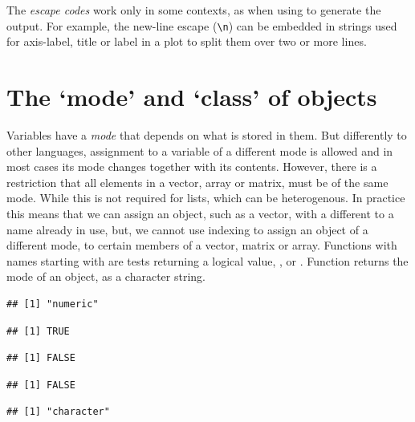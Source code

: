 \documentclass[krantz2]{krantz}\usepackage{knitr}%
\begin{document}
The \textit{escape codes} work only in some contexts, as when using  to generate the output. For example, the new-line escape (\verb|\n|) can be embedded in strings used for axis-label, title or label in a plot to split them over two or more lines.

\section{The `mode' and `class' of objects}\label{sec:rlang:mode}
Variables have a \emph{mode} that depends on what is stored in them. But differently to other languages, assignment to a variable of a different mode is allowed and in most cases its mode changes together with its contents. However, there is a restriction that all elements in a vector, array or matrix, must be of the same mode. While this is not required for lists, which can be heterogenous. In practice this means that we can assign an object, such as a vector, with a different  to a name already in use, but, we cannot use indexing to assign an object of a different mode, to certain members of a vector, matrix or array. Functions with names starting with  are tests returning a logical value, ,  or . Function  returns the mode of an object, as a character string.

\begin{knitrout}\footnotesize
{}\color{fgcolor}\begin{kframe}
\begin{alltt}
 \hlkwb{<-} \hlopt{:}
\end{alltt}
\begin{verbatim}
## [1] "numeric"
\end{verbatim}
\begin{alltt}
\end{alltt}
\begin{verbatim}
## [1] TRUE
\end{verbatim}
\begin{alltt}
\end{alltt}
\begin{verbatim}
## [1] FALSE
\end{verbatim}
\begin{alltt}
\end{alltt}
\begin{verbatim}
## [1] FALSE
\end{verbatim}
\begin{alltt}
 \hlkwb{<-} 
\end{alltt}
\begin{verbatim}
## [1] "character"
\end{verbatim}
\end{kframe}
\end{knitrout}
\end{document}
